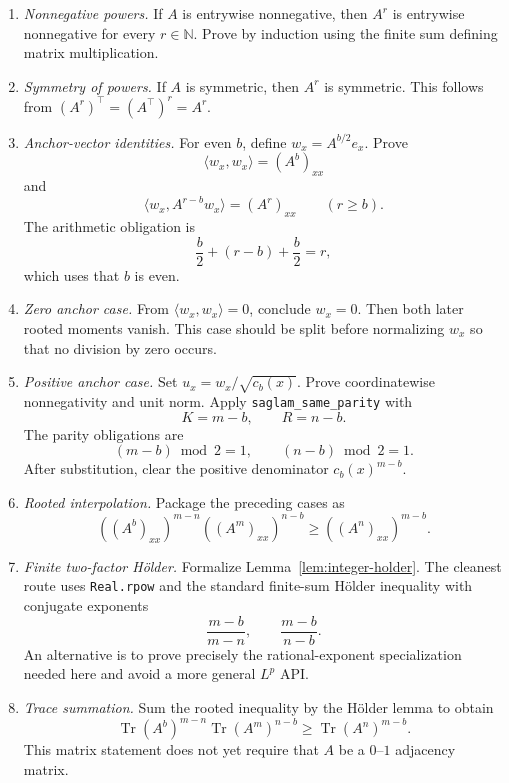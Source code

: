 \documentclass[11pt]{article}
\newcommand{\tr}{\operatorname{Tr}}
\newcommand{\NN}{\mathbb{N}}
\newcommand{\1}{\mathbf{1}}
\begin{document}
\begin{enumerate}[label=\textbf{L\arabic*.},leftmargin=2.4em]
\item \emph{Nonnegative powers.}
If $A$ is entrywise nonnegative, then $A^r$ is entrywise nonnegative for every
$r\in\NN$.  Prove by induction using the finite sum defining matrix
multiplication.

\item \emph{Symmetry of powers.}
If $A$ is symmetric, then $A^r$ is symmetric.  This follows from
$(A^r)^\top=(A^\top)^r=A^r$.

\item \emph{Anchor-vector identities.}
For even $b$, define $w_x=A^{b/2}e_x$.  Prove
\[
  \langle w_x,w_x\rangle=(A^b)_{xx}
\]
and
\[
  \langle w_x,A^{r-b}w_x\rangle=(A^r)_{xx}
  \qquad(r\ge b).
\]
The arithmetic obligation is
\[
  \frac b2+(r-b)+\frac b2=r,
\]
which uses that $b$ is even.

\item \emph{Zero anchor case.}
From $\langle w_x,w_x\rangle=0$, conclude $w_x=0$.  Then both later rooted
moments vanish.  This case should be split before normalizing $w_x$ so that no
division by zero occurs.

\item \emph{Positive anchor case.}
Set $u_x=w_x/\sqrt{c_b(x)}$.  Prove coordinatewise nonnegativity and unit norm.
Apply \texttt{saglam\_same\_parity} with
\[
  K=m-b,
  \qquad
  R=n-b.
\]
The parity obligations are
\[
  (m-b)\bmod2=1,
  \qquad
  (n-b)\bmod2=1.
\]
After substitution, clear the positive denominator $c_b(x)^{m-b}$.

\item \emph{Rooted interpolation.}
Package the preceding cases as
\[
  ((A^b)_{xx})^{m-n}((A^m)_{xx})^{n-b}
  \ge((A^n)_{xx})^{m-b}.
\]

\item \emph{Finite two-factor H\"older.}
Formalize Lemma~\ref{lem:integer-holder}.  The cleanest route uses
\texttt{Real.rpow} and the standard finite-sum H\"older inequality with conjugate
exponents
\[
  \frac{m-b}{m-n},
  \qquad
  \frac{m-b}{n-b}.
\]
An alternative is to prove precisely the rational-exponent specialization
needed here and avoid a more general $L^p$ API.

\item \emph{Trace summation.}
Sum the rooted inequality by the H\"older lemma to obtain
\[
  \tr(A^b)^{m-n}\tr(A^m)^{n-b}
  \ge\tr(A^n)^{m-b}.
\]
This matrix statement does not yet require that $A$ be a $0$--$1$ adjacency
matrix.


\end{enumerate}
\end{document}
